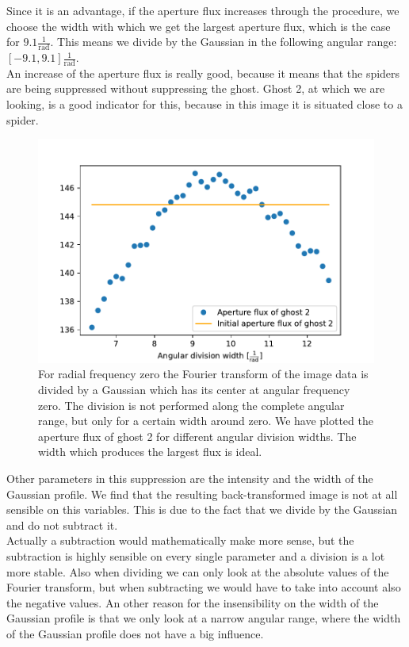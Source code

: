 Since it is an advantage, if the aperture flux increases through the procedure, we choose the width with which we get the largest aperture flux, which is the case for $9.1 \frac{1}{\mathrm{rad}}$. This means we divide by the Gaussian in the following angular range: $[-9.1, 9.1] \frac{1}{\mathrm{rad}}$.\\
An increase of the aperture flux is really good, because it means that the spiders are being suppressed without suppressing the ghost. Ghost 2, at which we are looking, is a good indicator for this, because in this image it is situated close to a spider.
\begin{figure}[H]
	\centering
		\includegraphics[width=1.0\textwidth]{pics/rad0_diffsubwidths.pdf}
		\caption{For radial frequency zero the Fourier transform of the image data is divided by a Gaussian which has its center at angular frequency zero. The division is not performed along the complete angular range, but only for a certain width around zero. We have plotted the aperture flux of ghost 2 for different angular division widths. The width which produces the largest flux is ideal.}
		\label{fig:rad0_diffsubwidths}
\end{figure}
Other parameters in this suppression are the intensity and the width of the Gaussian profile. We find that the resulting back-transformed image is not at all sensible on this variables. This is due to the fact that we divide by the Gaussian and do not subtract it.\\
Actually a subtraction would mathematically make more sense, but the subtraction is highly sensible on every single parameter and a division is a lot more stable. Also when dividing we can only look at the absolute values of the Fourier transform, but when subtracting we would have to take into account also the negative values. An other reason for the insensibility on the width of the Gaussian profile is that we only look at a narrow angular range, where the width of the Gaussian profile does not have a big influence. \\

